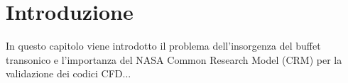 \chapter{Introduzione}


In questo capitolo viene introdotto il problema dell'insorgenza del buffet transonico e l'importanza del NASA Common Research Model (CRM) per la validazione dei codici CFD...